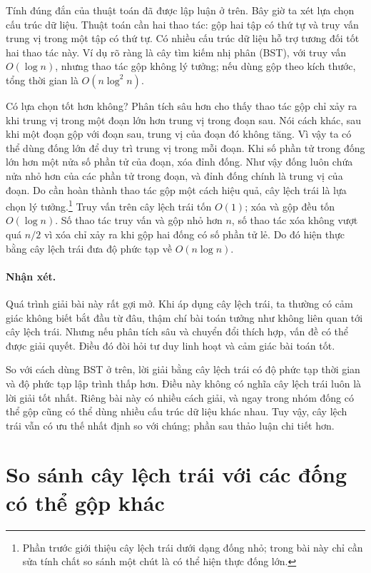 \documentclass[11pt]{article}
\begin{document}
Tính đúng đắn của thuật toán đã được lập luận ở trên. Bây giờ ta xét lựa chọn
cấu trúc dữ liệu. Thuật toán cần hai thao tác: gộp hai tập có thứ tự và truy vấn
trung vị trong một tập có thứ tự. Có nhiều cấu trúc dữ liệu hỗ trợ tương đối tốt
hai thao tác này. Ví dụ rõ ràng là cây tìm kiếm nhị phân (BST), với truy vấn
\(O(\log n)\), nhưng thao tác gộp không lý tưởng; nếu dùng gộp theo kích thước,
tổng thời gian là \(O(n\log^2 n)\).

Có lựa chọn tốt hơn không? Phân tích sâu hơn cho thấy thao tác gộp chỉ xảy ra
khi trung vị trong một đoạn lớn hơn trung vị trong đoạn sau. Nói cách khác, sau
khi một đoạn gộp với đoạn sau, trung vị của đoạn đó không tăng. Vì vậy ta có
thể dùng đống lớn để duy trì trung vị trong mỗi đoạn. Khi số phần tử trong đống
lớn hơn một nửa số phần tử của đoạn, xóa đỉnh đống. Như vậy đống luôn chứa nửa
nhỏ hơn của các phần tử trong đoạn, và đỉnh đống chính là trung vị của đoạn.
Do cần hoàn thành thao tác gộp một cách hiệu quả, cây lệch trái là lựa chọn lý
tưởng.\footnote{Phần trước giới thiệu cây lệch trái dưới dạng đống nhỏ; trong
bài này chỉ cần sửa tính chất so sánh một chút là có thể hiện thực đống lớn.}
Truy vấn trên cây lệch trái tốn \(O(1)\); xóa và gộp đều tốn \(O(\log n)\).
Số thao tác truy vấn và gộp nhỏ hơn \(n\), số thao tác xóa không vượt quá
\(n/2\) vì xóa chỉ xảy ra khi gộp hai đống có số phần tử lẻ. Do đó hiện thực
bằng cây lệch trái đưa độ phức tạp về \(O(n\log n)\).

\paragraph{Nhận xét.}
Quá trình giải bài này rất gợi mở. Khi áp dụng cây lệch trái, ta thường có cảm
giác không biết bắt đầu từ đâu, thậm chí bài toán tưởng như không liên quan tới
cây lệch trái. Nhưng nếu phân tích sâu và chuyển đổi thích hợp, vấn đề có thể
được giải quyết. Điều đó đòi hỏi tư duy linh hoạt và cảm giác bài toán tốt.

So với cách dùng BST ở trên, lời giải bằng cây lệch trái có độ phức tạp thời
gian và độ phức tạp lập trình thấp hơn. Điều này không có nghĩa cây lệch trái
luôn là lời giải tốt nhất. Riêng bài này có nhiều cách giải, và ngay trong nhóm
đống có thể gộp cũng có thể dùng nhiều cấu trúc dữ liệu khác nhau. Tuy vậy, cây
lệch trái vẫn có ưu thế nhất định so với chúng; phần sau thảo luận chi tiết hơn.

\section{So sánh cây lệch trái với các đống có thể gộp khác}
\end{document}
